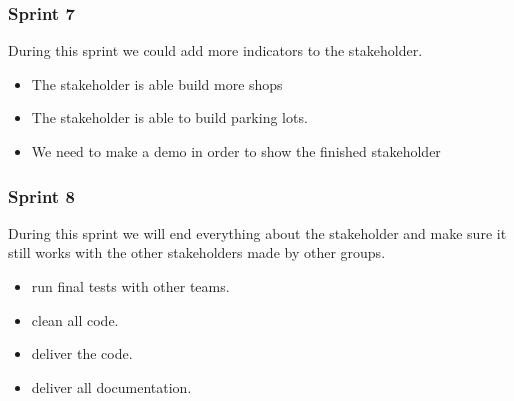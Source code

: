 \subsubsection{Sprint 7}
During this sprint we could add more indicators to the stakeholder.
\begin{itemize}
	\item The stakeholder is able build more shops
	\item The stakeholder is able to build parking lots.
	\item We need to make a demo in order to show the finished stakeholder
\end{itemize}

\subsubsection{Sprint 8}
During this sprint we will end everything about the stakeholder and make sure it still works with the other stakeholders made by other groups.
\begin{itemize}
	\item run final tests with other teams.
	\item clean all code.
	\item deliver the code.
	\item deliver all documentation.
\end{itemize}
\newpage
